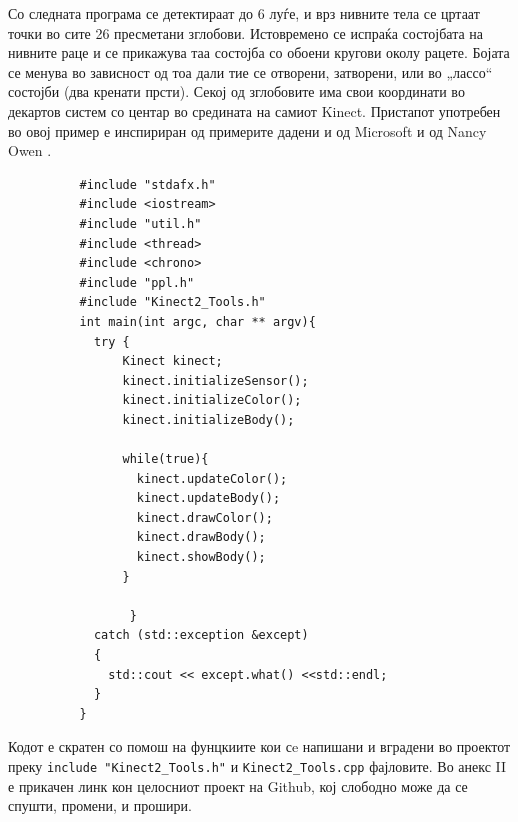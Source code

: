 \documentclass[12pt]{article}
\begin{document}
    Со следната програма се детектираат до 6 луѓе, и врз нивните тела се цртаат точки во сите 26 пресметани зглобови. Истовремено се испраќа состојбата на нивните раце и се прикажува таа состојба со обоени кругови околу рацете. Бојата се менува во зависност од тоа дали тие се отворени, затворени, или во „лассо“ состојби (два кренати прсти). Секој од зглобовите има свои координати во декартов систем со центар во средината на самиот Kinect. Пристапот употребен во овој пример е инспириран од примерите дадени и од Microsoft и од Nancy Owen \cite{nancyowen}.
    \begin{verbatim}
          #include "stdafx.h"
          #include <iostream>
          #include "util.h"
          #include <thread>
          #include <chrono>
          #include "ppl.h"
          #include "Kinect2_Tools.h"
          int main(int argc, char ** argv){
            try {
                Kinect kinect;
                kinect.initializeSensor();
                kinect.initializeColor();
                kinect.initializeBody();

                while(true){
                  kinect.updateColor();
                  kinect.updateBody();
                  kinect.drawColor();
                  kinect.drawBody();
                  kinect.showBody();
                }

                 }
            catch (std::exception &except)
            {
              std::cout << except.what() <<std::endl;
            }
          }
        \end{verbatim}

    Кодот е скратен со помош на фунцкиите кои сe напишани и вградени во проектот преку \verb+include "Kinect2_Tools.h"+ и \verb+Kinect2_Tools.cpp+ фајловите. Во анекс II е прикачен линк кон целосниот проект на Github, кој слободно може да се спушти, промени, и прошири.
\end{document}
